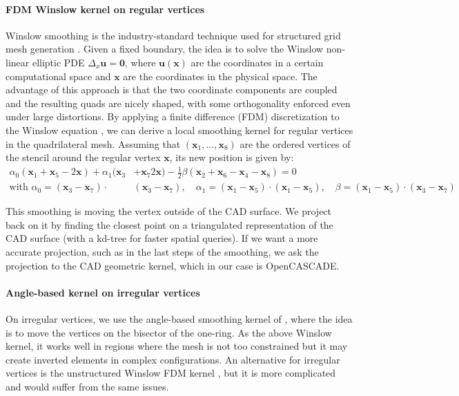\documentclass[AMA,STIX1COL]{WileyNJD-v2}
\newcommand{\vx}{\ensuremath{\mathbf{x}}}
\newcommand{\vu}{\ensuremath{\mathbf{u}}}
\begin{document}
{\paragraph{FDM Winslow kernel on regular vertices} 
Winslow smoothing \cite{winslow1966} is the industry-standard technique used
for structured grid mesh generation \cite{thompson1998}. Given a fixed
boundary, the idea is to solve the Winslow non-linear elliptic PDE $\Delta_x \vu =
\mathbf{0}$, where $\vu(\vx)$ are the coordinates in a certain computational
space and $\vx$ are the coordinates in the physical space.
The advantage of this approach is that the two coordinate components are
coupled and the resulting quads are nicely shaped, with some orthogonality
enforced even under large distortions. By applying a finite difference (FDM)
discretization to the Winslow equation \cite{knupp1999}, we can derive a local smoothing kernel for
regular vertices in the quadrilateral mesh. Assuming that $(\vx_1, ..., \vx_8)$
are the ordered vertices of the stencil around the regular vertex $\vx$, its
new position is given by:
\begin{equation}
    \begin{split}
    \alpha_0 (\vx_1+\vx_5 - 2 \vx)
    + \alpha_1 (\vx_3 & +\vx_7  2 \vx)
    - \frac{1}{2} \beta (\vx_2 + \vx_6 - \vx_4 - \vx_8) = 0 \\
    \text{with } 
        \alpha_0 = (\vx_3-\vx_7) \cdot& (\vx_3-\vx_7), \quad
    \alpha_1 = (\vx_1-\vx_5) \cdot (\vx_1-\vx_5), \quad
    \beta = (\vx_1-\vx_5) \cdot (\vx_3-\vx_7)
    \end{split}
\end{equation}

This smoothing is moving the vertex outside of the CAD surface. 
We project back on it by finding the closest point
on a triangulated representation of the CAD surface (with a kd-tree for faster
spatial queries). If we want a more accurate projection, such as in the last
steps of the smoothing, we ask the projection to the CAD geometric kernel,
which in our case is OpenCASCADE. 

\paragraph{Angle-based kernel on irregular vertices} On irregular vertices,
we use the angle-based smoothing kernel of \cite{akram2021}, where the idea
is to move the vertices on the bisector of the one-ring. As the above Winslow
kernel, it works well in regions where the mesh is not too constrained but
it may create inverted elements in complex configurations. An alternative
for irregular vertices is the unstructured Winslow FDM kernel \cite{knupp1999},
but it is more complicated and would suffer from the same issues.

}
\end{document}
